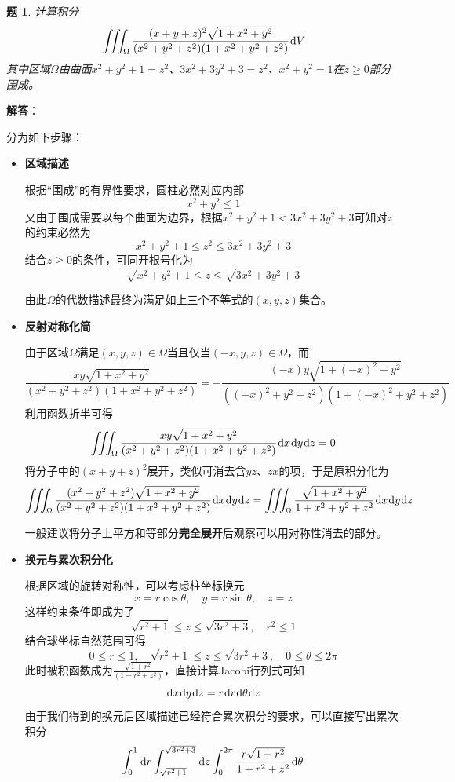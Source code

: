 \documentclass[a4paper,UTF8,fontset=windows,AutoFakeBold]{ctexart}
\newcommand*{\dr}{\hspace{0.07em}\mathrm{d}}
\newcommand*{\note}{\noindent *}
\theoremstyle{ex}
\newtheorem{exercise}{题}
\newcommand{\sol}[1]{{\vspace{5pt}\kaishu\noindent\textbf{解答}：\vspace{-3pt}
\begin{compactitem}
    \item[] #1
\end{compactitem}
}}
\begin{document}
\begin{framed}
\begin{exercise}
    计算积分
    $$\iiint_\Omega\frac{(x+y+z)^2\sqrt{1+x^2+y^2}}{(x^2+y^2+z^2)(1+x^2+y^2+z^2)}\dr V$$
    其中区域$\Omega$由曲面$x^2+y^2+1=z^2$、$3x^2+3y^2+3=z^2$、$x^2+y^2=1$在$z\ge0$部分围成。
\end{exercise}
\sol{
    分为如下步骤：
    \begin{itemize}
        \item \textbf{区域描述}

        根据``围成''的有界性要求，圆柱必然对应内部
        $$x^2+y^2\le1$$
        又由于围成需要以每个曲面为边界，根据$x^2+y^2+1<3x^2+3y^2+3$可知对$z$的约束必然为
        $$x^2+y^2+1\le z^2\le 3x^2+3y^2+3$$
        结合$z\ge0$的条件，可同开根号化为
        $$\sqrt{x^2+y^2+1}\le z\le\sqrt{3x^2+3y^2+3}$$

        由此$\Omega$的代数描述最终为满足如上三个不等式的$(x,y,z)$集合。

        \item \textbf{反射对称化简}
        
        由于区域$\Omega$满足$(x,y,z)\in\Omega$当且仅当$(-x,y,z)\in\Omega$，而
        $$\frac{xy\sqrt{1+x^2+y^2}}{(x^2+y^2+z^2)(1+x^2+y^2+z^2)}=-\frac{(-x)y\sqrt{1+(-x)^2+y^2}}{((-x)^2+y^2+z^2)(1+(-x)^2+y^2+z^2)}$$
        利用函数折半可得
        $$\iiint_\Omega\frac{xy\sqrt{1+x^2+y^2}}{(x^2+y^2+z^2)(1+x^2+y^2+z^2)}\dr x\dr y\dr z=0$$
        将分子中的$(x+y+z)^2$展开，类似可消去含$yz$、$zx$的项，于是原积分化为
        $$\iiint_\Omega\frac{(x^2+y^2+z^2)\sqrt{1+x^2+y^2}}{(x^2+y^2+z^2)(1+x^2+y^2+z^2)}\dr x\dr y\dr z=\iiint_\Omega\frac{\sqrt{1+x^2+y^2}}{1+x^2+y^2+z^2}\dr x\dr y\dr z$$


        \note 一般建议将分子上平方和等部分\textbf{完全展开}后观察可以用对称性消去的部分。

        \item \textbf{换元与累次积分化}
        
        根据区域的旋转对称性，可以考虑柱坐标换元
        $$x=r\cos\theta,\quad y=r\sin\theta,\quad z=z$$
        这样约束条件即成为了
        $$\sqrt{r^2+1}\le z\le\sqrt{3r^2+3},\quad r^2\le1$$
        结合球坐标自然范围可得
        $$0\le r\le1,\quad\sqrt{r^2+1}\le z\le\sqrt{3r^2+3},\quad0\le\theta\le2\pi$$        
        此时被积函数成为$\frac{\sqrt{1+r^2}}{(1+r^2+z^2)}$，直接计算Jacobi行列式可知
        $$\dr x\dr y\dr z=r\dr r\dr\theta\dr z$$
        由于我们得到的换元后区域描述已经符合累次积分的要求，可以直接写出累次积分
        $$\int_0^1\dr r\int_{\sqrt{r^2+1}}^{\sqrt{3r^2+3}}\dr z\int_0^{2\pi}\frac{r\sqrt{1+r^2}}{1+r^2+z^2}\dr\theta$$


\end{itemize}}
\end{framed}
\end{document}
